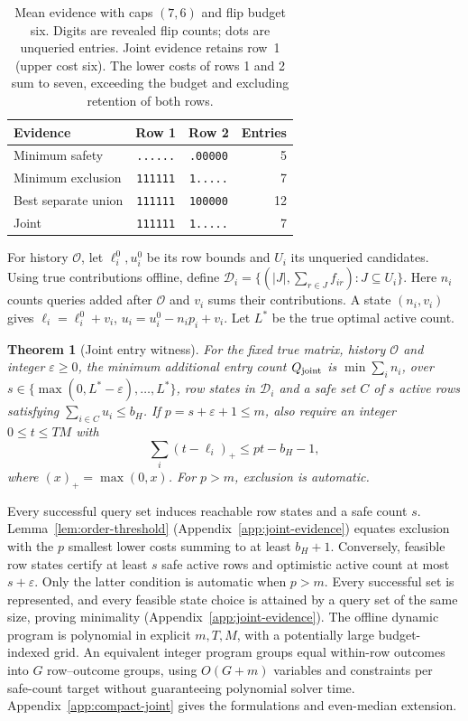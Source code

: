 \documentclass[11pt]{article}
\newtheorem{theorem}{Theorem}
\begin{document}
\begin{table}[t]
\centering\small
\begin{tabular}{@{}lccr@{}}
\toprule
Evidence & Row 1 & Row 2 & Entries\\
\midrule
Minimum safety & \texttt{......} & \texttt{.00000} & 5\\
Minimum exclusion & \texttt{111111} & \texttt{1.....} & 7\\
Best separate union & \texttt{111111} & \texttt{100000} & 12\\
Joint & \texttt{111111} & \texttt{1.....} & 7\\
\bottomrule
\end{tabular}
\caption{Mean evidence with caps $(7,6)$ and flip budget six. Digits are revealed flip counts; dots are unqueried entries. Joint evidence retains row~1 (upper cost six). The lower costs of rows 1 and 2 sum to seven, exceeding the budget and excluding retention of both rows.}
\label{tab:joint-example}
\end{table}

For history $\mathcal O$, let $\ell_i^0,u_i^0$ be its row bounds and $U_i$ its unqueried candidates. Using true contributions offline, define $\mathcal D_i=\{(|J|,\sum_{r\in J}f_{ir}):J\subseteq U_i\}$. Here $n_i$ counts queries added after $\mathcal O$ and $v_i$ sums their contributions. A state $(n_i,v_i)$ gives $\ell_i=\ell_i^0+v_i$, $u_i=u_i^0-n_ip_i+v_i$. Let $L^*$ be the true optimal active count.
\begin{theorem}[Joint entry witness]
\label{thm:joint}
For the fixed true matrix, history $\mathcal O$ and integer $\varepsilon\ge0$, the minimum additional entry count $Q_{\rm joint}$ is $\min\sum_i n_i$, over $s\in\{\max(0,L^*-\varepsilon),\ldots,L^*\}$, row states in $\mathcal D_i$ and a safe set $C$ of $s$ active rows satisfying $\sum_{i\in C}u_i\le b_H$. If $p=s+\varepsilon+1\le m$, also require an integer $0\le t\le TM$ with
\[
 \sum_i(t-\ell_i)_+\le pt-b_H-1,
\]
where $(x)_+=\max(0,x)$. For $p>m$, exclusion is automatic.
\end{theorem}
Every successful query set induces reachable row states and a safe count $s$. Lemma~\ref{lem:order-threshold} (Appendix~\ref{app:joint-evidence}) equates exclusion with the $p$ smallest lower costs summing to at least $b_H+1$. Conversely, feasible row states certify at least $s$ safe active rows and optimistic active count at most $s+\varepsilon$. Only the latter condition is automatic when $p>m$. Every successful set is represented, and every feasible state choice is attained by a query set of the same size, proving minimality (Appendix~\ref{app:joint-evidence}). The offline dynamic program is polynomial in explicit $m,T,M$, with a potentially large budget-indexed grid. An equivalent integer program groups equal within-row outcomes into $G$ row--outcome groups, using $O(G+m)$ variables and constraints per safe-count target without guaranteeing polynomial solver time. Appendix~\ref{app:compact-joint} gives the formulations and even-median extension.
\end{document}
